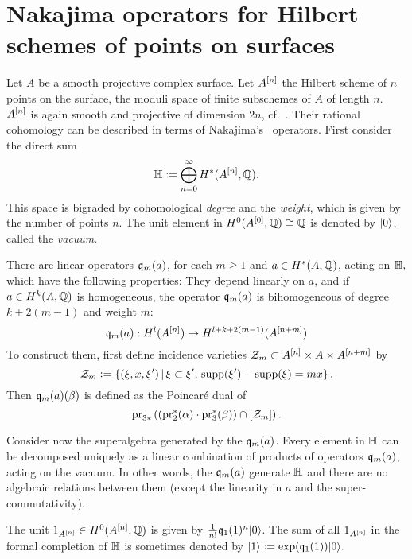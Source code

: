 \section[Nakajima operators for Hilbert schemes of points on surfaces]{Nakajima operators for Hilbert schemes of points on surfaces%
}
\label{Section_Hilbert}
Let $A$ be a smooth projective complex surface. 
Let $A^{[n]}$ the Hilbert scheme of $n$ points on the surface, \ie the moduli space of finite subschemes of $A$ of length $n$.
$A^{[n]}$ is again smooth and projective of dimension $2n$, cf.~\cite{Fogarty}. 
Their rational cohomology can be described in terms of Nakajima's~\cite{Nakajima} operators. First consider the direct sum
$$
\mathbb{H} \vcentcolon=  \bigoplus_{n=0}^{\infty} H^*(A^{[n]},\mathbb{Q}).
$$
This space is bigraded by cohomological \emph{degree} and the \emph{weight}, which is given by the number of points $n$. The unit element in $H^0(A^{[0]},\mathbb{Q}) \cong \mathbb{Q}$ is denoted by $|0\rangle$, called the \emph{vacuum}.
\begin{defipro}
There are linear operators $\mathfrak{q}_m(a)$, for each $m\geq 1$ and $a \in H^*(A,\mathbb{Q})$, acting on $\mathbb{H},$ which have the following properties: They depend linearly on $a$, and if $a\in H^k(A,\mathbb{Q})$ is homogeneous, the operator $\mathfrak{q}_{m}(a)$ is bihomogeneous of degree $k+2(m-1)$ and weight $m$:
$$
\mathfrak{q}_{m}(a) : H^l(A^{[n]}) \rightarrow H^{l+k+2(m-1)}(A^{[n+m]})
$$
To construct them, first define incidence varieties $\mathcal Z_m\subset A^{[n]}\times A\times A^{[n+m]}$ by
$$
\mathcal Z_m \vcentcolon=  \left\{(\xi,x,\xi')\, |\, \xi\subset\xi',\, \operatorname{supp}(\xi') -\operatorname{supp}(\xi) = mx \right\}.
$$
Then $\mathfrak{q}_m(a)(\beta) $ is defined as the Poincar\'e dual of 
$$
\operatorname{pr}_{3*}\left( \left(\operatorname{pr}_2^*(\alpha)\cdot \operatorname{pr}_3^*(\beta)\right) \cap [\mathcal Z_m] \right).
$$
\end{defipro}
Consider now the superalgebra generated by the $\mathfrak{q}_m(a)$. 
Every element in $\mathbb{H}$ can be decomposed uniquely as a linear combination of products of operators $\mathfrak{q}_{m}(a)$, acting on the vacuum. 
In other words, the $\mathfrak{q}_m(a)$ generate $\mathbb{H}$ and there are no algebraic relations between them (except the linearity in $a$ and the super-commutativity).
\begin{example}
The unit $1_{A^{[n]}} \in H^0({A^{[n]}},\mathbb{Q})$ is given by $\frac{1}{n!}\mathfrak{q}_1(1)^n|0\rangle$. The sum of all $1_{A^{[n]}}$ in the formal completion of $\mathbb{H}$ is sometimes denoted by
$
\left|1\right> \vcentcolon=  \exp(\mathfrak{q}_1(1))|0\rangle.
$
\end{example}

